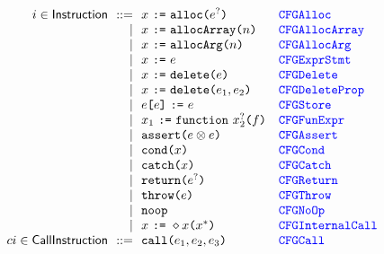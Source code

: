 \[
\begin{array}{r@{~~}r@{~~}lll}
i \in \Instruction & ::= & 
x~\verb+:=+~\TT{alloc}\verb+(+ e^{?} \verb+)+
& \mbox{\tt\inblue CFGAlloc}
\\

& \mid & x~\verb+:=+~\TT{allocArray}\verb+(+n\verb+)+
 & \mbox{\tt\inblue CFGAllocArray}
\\

& \mid & x~\verb+:=+~\TT{allocArg}\verb+(+n\verb+)+
 & \mbox{\tt\inblue CFGAllocArg}
\\

& \mid & x ~\verb+:=+~ e
 & \mbox{\tt\inblue CFGExprStmt}
\\

& \mid & x ~\verb+:=+~ \TT{delete}\verb+(+e\verb+)+
 & \mbox{\tt\inblue CFGDelete}
\\

& \mid & x ~\verb+:=+~ \TT{delete}\verb+(+e_1,e_2\verb+)+
 & \mbox{\tt\inblue CFGDeleteProp}
\\

& \mid & e\verb+[+e\verb+]+ ~\verb+:=+~ e 
 & \mbox{\tt\inblue CFGStore}
\\

& \mid & x_1 ~\verb+:=+~ \TT{function} ~x_2^{?}\verb+(+f\verb+)+
 & \mbox{\tt\inblue CFGFunExpr}
\\

& \mid & \TT{assert}\verb+(+e\inop e\verb+)+ 
 & \mbox{\tt\inblue CFGAssert}
\\

& \mid & \TT{cond}\verb+(+x\verb+)+
 & \mbox{\tt\inblue CFGCond}
\\

& \mid & \TT{catch}\verb+(+x\verb+)+
 & \mbox{\tt\inblue CFGCatch}
\\

& \mid & \TT{return}\verb+(+e^{?}\verb+)+ 
 & \mbox{\tt\inblue CFGReturn}
\\

& \mid & \TT{throw}\verb+(+e\verb+)+
 & \mbox{\tt\inblue CFGThrow}
\\

& \mid & \TT{noop}
 & \mbox{\tt\inblue CFGNoOp}
\\

& \mid & x ~\verb+:=+~\ensuremath{\diamond}x\verb+(+x^{*}\verb+)+
 & \mbox{\tt\inblue CFGInternalCall}
\\

ci \in \SF{CallInstruction}& ::= & \TT{call}\verb+(+e_1,e_2,e_3\verb+)+
 & \mbox{\tt\inblue CFGCall}
\\


\end{array}\]
